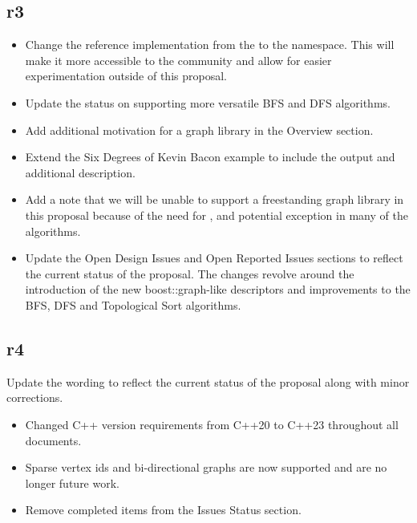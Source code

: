 \subsection*{\paperno r3}
\begin{itemize}
      \item Change the reference implementation from the  to the  namespace. This will
            make it more accessible to the community and allow for easier experimentation outside of this proposal.
      \item Update the status on supporting more versatile BFS and DFS algorithms.
      \item Add additional motivation for a graph library in the Overview section.
      \item Extend the Six Degrees of Kevin Bacon example to include the output and additional description.
      \item Add a note that we will be unable to support a freestanding graph library in this proposal because
            of the need for ,  and potential  exception in many of 
            the algorithms.
      \item Update the Open Design Issues and Open Reported Issues sections to reflect the current status of the proposal.
            The changes revolve around the introduction of the new boost::graph-like descriptors and improvements to the
            BFS, DFS and Topological Sort algorithms.
\end{itemize}

\subsection*{\paperno r4}
Update the wording to reflect the current status of the proposal along with minor corrections.
\begin{itemize}
      \item Changed C++ version requirements from C++20 to C++23 throughout all documents.
      \item Sparse vertex ids and bi-directional graphs are now supported and are no longer future work.
      \item Remove completed items from the Issues Status section.
\end{itemize}
